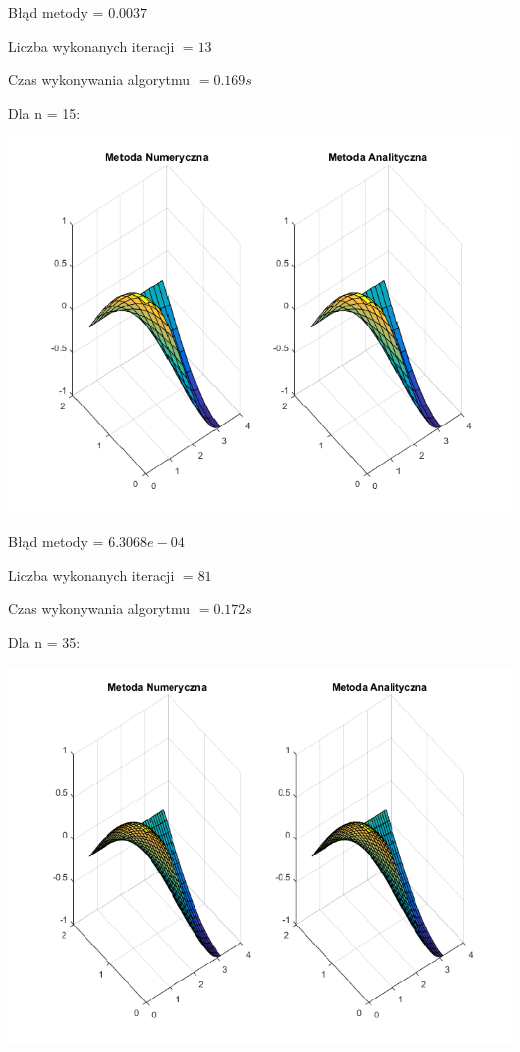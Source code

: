 Błąd metody = $0.0037$

Liczba wykonanych iteracji $ = 13 $

Czas wykonywania algorytmu $ = 0.169 s$

\newpage

Dla n = 15:

{\centering
	
	\includegraphics{Lab6/charts/jacobi/2_15.png}
	
}

Błąd metody = $6.3068e-04$

Liczba wykonanych iteracji $ = 81 $

Czas wykonywania algorytmu $ = 0.172 s$

\newpage

Dla n = 35:

{\centering
	
	\includegraphics{Lab6/charts/jacobi/2_35.png}
	
}

